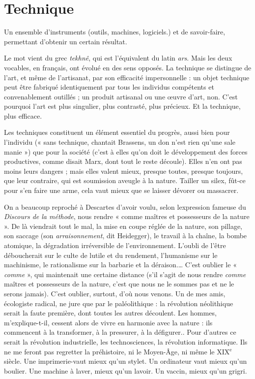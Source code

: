 \section{Technique}
Un ensemble d'instruments (outils, machines, logiciels.) et
de savoir-faire, permettant d’obtenir un certain résultat.

Le mot vient du grec {\it tekhnê}, qui est l’équivalent du latin {\it ars}. Mais les deux
vocables, en français, ont évolué en des sens opposés. La technique se distingue
de l’art, et même de l’artisanat, par son efficacité impersonnelle : un objet technique
peut être fabriqué identiquement par tous les individus compétents et
convenablement outillés ; un produit artisanal ou une œuvre d’art, non. C’est
pourquoi l’art est plus singulier, plus contrasté, plus précieux. Et la technique,
plus efficace.

Les techniques constituent un élément essentiel du progrès, aussi bien pour
l'individu (« sans technique, chantait Brassens, un don n’est rien qu’une sale
manie ») que pour la société (c’est à elles qu’on doit le développement des
forces productives, comme disait Marx, dont tout le reste découle). Elles n’en
ont pas moins leurs dangers ; mais elles valent mieux, presque toutes, presque
toujours, que leur contraire, qui est soumission aveugle à la nature. Tailler un
silex, fût-ce pour s’en faire une arme, cela vaut mieux que se laisser dévorer ou
massacrer.

On a beaucoup reproché à Descartes d’avoir voulu, selon lexpression
fameuse du {\it Discours de la méthode}, nous rendre « comme maîtres et possesseurs
de la nature ». De là viendrait tout le mal, la mise en coupe réglée de la nature,
son pillage, son saccage (son {\it arraisonnement}, dit Heidegger), le travail à la
chaîne, la bombe atomique, la dégradation irréversible de l’environnement.
L’oubli de l’être déboucherait sur le culte de lutile et du rendement, l’humanisme
sur le machinisme, le rationalisme sur la barbarie et la déraison.… C’est
oublier le « {\it comme} », qui maintenait une certaine distance (s’il s’agit de nous
rendre {\it comme} maîtres et possesseurs de la nature, c’est que nous ne le sommes
pas et ne le serons jamais). C’est oublier, surtout, d’où nous venons. Un de mes
amis, écologiste radical, ne jure que par le paléolithique : la révolution néolithique
serait la faute première, dont toutes les autres découlent. Les hommes,
m’explique-t-il, cessent alors de vivre en harmonie avec la nature : ils commencent
à la transformer, à la pressurer, à la défigurer.. Pour d’autres ce serait la
révolution industrielle, les technosciences, la révolution informatique. Ils ne
me feront pas regretter la préhistoire, ni le Moyen-Âge, ni même le {\footnotesize XIX$^\text{e}$} siècle.
Une imprimerie-vaut mieux qu’un stylet. Un ordinateur vaut mieux qu’un
boulier. Une machine à laver, mieux qu’un lavoir. Un vaccin, mieux qu’un
grigri.

